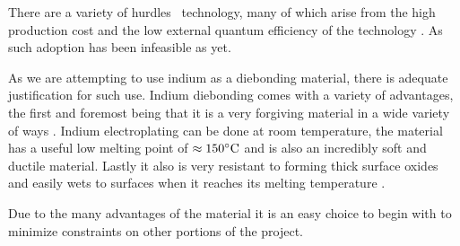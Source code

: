 
There are a variety of hurdles \uled  \ technology, many of which arise from the high production cost and the low external quantum efficiency of the technology \cite{uledhurdles}. As such adoption has been infeasible as yet.




As we are attempting to use indium as a diebonding material, there is adequate justification for such use. Indium diebonding comes with a variety of advantages, the first and foremost being that it is a very forgiving material in a wide variety of ways \cite{indiumCorpBath}. Indium electroplating can be done at room temperature, the material has a useful low melting point of $\approx 150 \dC$ \cite{indiumCorpConstants} and is also an incredibly soft and ductile material. Lastly it also is very resistant to forming thick surface oxides and easily wets to surfaces when it reaches its melting temperature \cite{indium_diebonding}.

Due to the many advantages of the material it is an easy choice to begin with to minimize constraints on other portions of the project.





